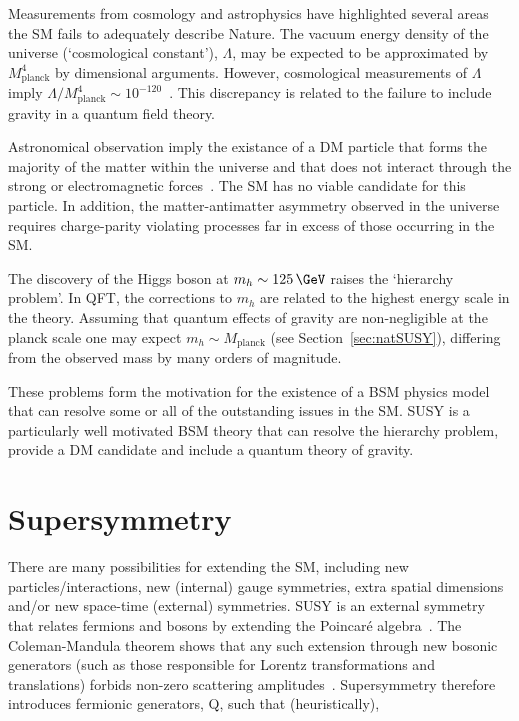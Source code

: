 Measurements from cosmology and astrophysics have highlighted several areas
the SM fails to adequately describe Nature. The vacuum energy density 
of the universe (`cosmological constant'), $\Lambda$, 
may be expected to be approximated by $M^4_{\text{planck}}$ by dimensional 
arguments. However, cosmological measurements of $\Lambda$ imply 
$\Lambda/M_{\text{planck}}^4 \sim 10^{-120}$~\cite{cosConst}. This discrepancy
is related to the failure to include gravity in a quantum field theory.

Astronomical observation imply the existance of a DM particle
that forms the majority of the matter within the universe
and that does not interact through the strong or electromagnetic forces~\cite{WIMP}.
The SM has no viable candidate for this particle. In addition, the matter-antimatter 
asymmetry observed in the universe requires 
charge-parity violating processes far in excess of those occurring in the SM.

The discovery of the Higgs boson at $m_{h}\sim125\,\GeV$ raises the `hierarchy problem'. 
In QFT, the corrections to $m_h$ are related to the highest energy scale in the theory.
Assuming that quantum effects of gravity are non-negligible at the planck scale 
one may expect $m_h \sim M_{\text{planck}}$ (see Section~\ref{sec:natSUSY}), differing
from the observed mass by many orders of magnitude.

These problems form the motivation for the existence of a BSM physics model that
can resolve some or all of the outstanding issues in the SM. SUSY is a particularly
well motivated BSM theory that can resolve the hierarchy problem, provide a DM candidate
and include a quantum theory of gravity.

\section{Supersymmetry}

There are many possibilities for extending the SM, 
including new particles/interactions, new (internal) gauge symmetries, 
extra spatial dimensions and/or new space-time (external) symmetries. SUSY is 
an external symmetry that relates fermions and bosons by extending the Poincar\'{e} algebra~\cite{SUSYC}. 
The Coleman-Mandula theorem shows that any such extension through new bosonic generators (such as those responsible for Lorentz 
transformations and translations) forbids non-zero scattering amplitudes~\cite{Coleman}. 
Supersymmetry therefore introduces fermionic generators, Q, such that (heuristically),

